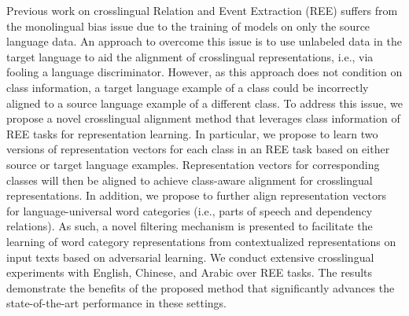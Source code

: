 Previous work on crosslingual Relation and Event Extraction (REE) suffers from the monolingual bias issue due to the training of models on only the source language data. An approach to overcome this issue is to use unlabeled data in the target language to aid the alignment of crosslingual representations, i.e., via fooling a language discriminator. However, as this approach does not condition on class information, a target language example of a class could be incorrectly aligned to a source language example of a different class. To address this issue, we propose a novel crosslingual alignment method that leverages class information of REE tasks for representation learning. In particular, we propose to learn two versions of representation vectors for each class in an REE task based on either source or target language examples. Representation vectors for corresponding classes will then be aligned to achieve class-aware alignment for crosslingual representations. In addition, we propose to further align representation vectors for language-universal word categories (i.e., parts of speech and dependency relations). As such, a novel filtering mechanism is presented to facilitate the learning of word category representations from contextualized representations on input texts based on adversarial learning. We conduct extensive crosslingual experiments with English, Chinese, and Arabic over REE tasks. The results demonstrate the benefits of the proposed method that significantly advances the state-of-the-art performance in these settings.
